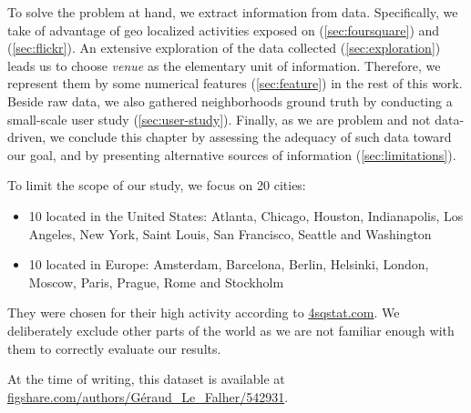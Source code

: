 To solve the problem at hand, we extract information from data. Specifically,
we take of advantage of geo localized activities exposed on \fs{}
(\autoref{sec:foursquare}) and \flickr{} (\autoref{sec:flickr}). An extensive
exploration of the data collected (\autoref{sec:exploration}) leads us to
choose \emph{venue} as the elementary unit of information. Therefore, we
represent them by some numerical features (\autoref{sec:feature}) in the rest
of this work. Beside raw data, we also gathered neighborhoods ground truth by conducting a
small-scale user study (\autoref{sec:user-study}). Finally, as we are problem
and not data-driven, we conclude this chapter by assessing the adequacy of such
data toward our goal, and by presenting alternative sources of information
(\autoref{sec:limitations}).

To limit the scope of our study, we focus on 20 cities:
\begin{itemize}
	\item 10 located in the United States: Atlanta, Chicago, Houston,
		Indianapolis, Los Angeles, New York, Saint Louis, San Francisco,
		Seattle and Washington
	\item 10 located in Europe: Amsterdam, Barcelona, Berlin, Helsinki, London,
		Moscow, Paris, Prague, Rome and Stockholm
\end{itemize}

They were chosen for their high activity according to
\href{http://www.4sqstat.com/}{4sqstat.com}. We deliberately exclude other
parts of the world as we are not familiar enough with them to correctly
evaluate our results.

At the time of writing, this dataset is available at
\href{http://figshare.com/authors/G\%C3\%A9raud_Le_Falher/542931}%
{\url{figshare.com/authors/Géraud_Le_Falher/542931}}.

